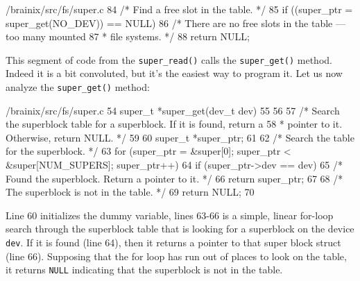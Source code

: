 \documentclass{article}
\begin{document}
\begin{code}{/brainix/src/fs/super.c}
84      /* Find a free slot in the table. */
85      if ((super_ptr = super_get(NO_DEV)) == NULL)
86           /* There are no free slots in the table --- too many mounted
87            * file systems. */
88           return NULL;
\end{code}
This segment of code from the \verb|super_read()| calls the \verb|super_get()| method. Indeed it is a bit convoluted, but it's the easiest way to program it. Let us now analyze the \verb|super_get()| method:
\begin{code}{/brainix/src/fs/super.c}
54 super_t *super_get(dev_t dev)
55 {
56 
57 /* Search the superblock table for a superblock.  If it is found, return a
58  * pointer to it.  Otherwise, return NULL. */
59 
60      super_t *super_ptr;
61 
62      /* Search the table for the superblock. */
63      for (super_ptr = &super[0]; super_ptr < &super[NUM_SUPERS]; super_ptr++)
64           if (super_ptr->dev == dev)
65                /* Found the superblock.  Return a pointer to it. */
66                return super_ptr;
67 
68      /* The superblock is not in the table. */
69      return NULL;
70 }
\end{code}
Line 60 initializes the dummy variable, lines 63-66 is a simple, linear for-loop search through the superblock table that is looking for a superblock on the device \verb|dev|. If it is found (line 64), then it returns a pointer to that super block struct (line 66). Supposing that the for loop has run out of places to look on the table, it returns \verb|NULL| indicating that the superblock is not in the table.
\end{document}
